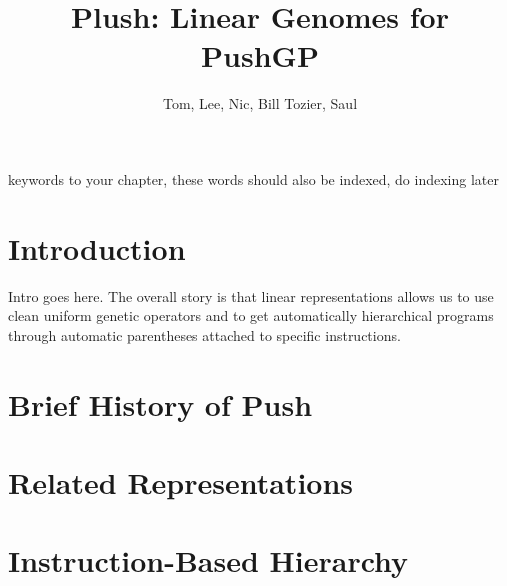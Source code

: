 %

\title*{Plush: Linear Genomes for PushGP}
\author{Tom, Lee, Nic, Bill Tozier, Saul}

\maketitle


\begin{keywords}
keywords to your chapter, these words should also be indexed, do indexing later
\end{keywords}

\section{Introduction}
\label{Introduction}

Intro goes here. The overall story is that linear representations allows us to use clean uniform genetic operators and to get automatically hierarchical programs through automatic parentheses attached to specific instructions.



\section{Brief History of Push}


\section{Related Representations}



\section{Instruction-Based Hierarchy}

